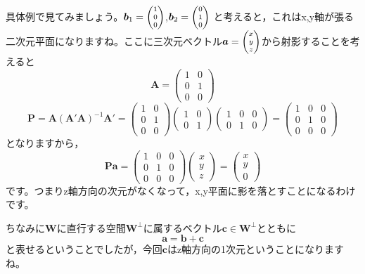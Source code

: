 \documentclass{ltjsbook}
\begin{document}
具体例で見てみましょう。$\bm{b}_1 = \scriptsize\begin{pmatrix}1\\0\\0\end{pmatrix}$,$\bm{b}_2 = \scriptsize\begin{pmatrix}0\\1\\0\end{pmatrix}$ と考えると，これはx,y軸が張る二次元平面になりますね。ここに三次元ベクトル$\bm{a} = \scriptsize\begin{pmatrix}x\\y\\z\end{pmatrix}$から射影することを考えると
\[ \bm{A} = \begin{pmatrix} 1 & 0\\0&1\\0&0 \end{pmatrix} \]
\[ \bm{P} = \bm{A}(\bm{A}'\bm{A})^{-1}\bm{A}' =
	\begin{pmatrix}1 & 0\\0&1\\0&0\end{pmatrix} \begin{pmatrix}1 & 0\\0&1\end{pmatrix} \begin{pmatrix}1 & 0 & 0 \\ 0 & 1 & 0 \end{pmatrix} =
	\begin{pmatrix} 1 & 0 & 0 \\ 0 & 1 & 0 \\ 0 & 0 & 0 \end{pmatrix} \]
となりますから，
\[ \bm{Pa} =  \begin{pmatrix} 1 & 0 & 0 \\ 0 & 1 & 0 \\ 0 & 0 & 0 \end{pmatrix} \begin{pmatrix}x\\y\\z\end{pmatrix} = \begin{pmatrix} x\\y\\0 \end{pmatrix} \]
です。つまりz軸方向の次元がなくなって，x,y平面に影を落とすことになるわけです。

ちなみに$\bm{W}$に直行する空間$\bm{W}^{\perp}$に属するベクトル$\bm{c} \in \bm{W}^{\perp}$とともに
\[ \bm{a} = \bm{b} + \bm{c} \]
と表せるということでしたが，今回$\bm{c}$はz軸方向の1次元ということになりますね。
\end{document}
